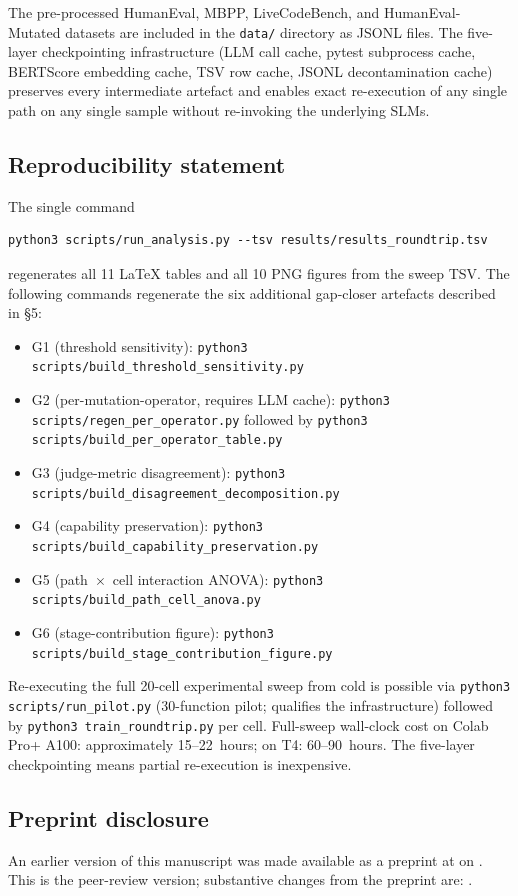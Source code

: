 The pre-processed HumanEval, MBPP, LiveCodeBench, and HumanEval-Mutated datasets are included in the \texttt{data/} directory as JSONL files. The five-layer checkpointing infrastructure (LLM call cache, pytest subprocess cache, BERTScore embedding cache, TSV row cache, JSONL decontamination cache) preserves every intermediate artefact and enables exact re-execution of any single path on any single sample without re-invoking the underlying SLMs.

\subsection{Reproducibility statement}

The single command
\begin{verbatim}
python3 scripts/run_analysis.py --tsv results/results_roundtrip.tsv
\end{verbatim}
regenerates all 11 LaTeX tables and all 10 PNG figures from the sweep TSV. The following commands regenerate the six additional gap-closer artefacts described in \S{}5:
\begin{itemize}
  \item G1 (threshold sensitivity): \texttt{python3 scripts/build\_threshold\_sensitivity.py}
  \item G2 (per-mutation-operator, requires LLM cache): \texttt{python3 scripts/regen\_per\_operator.py} followed by \texttt{python3 scripts/build\_per\_operator\_table.py}
  \item G3 (judge-metric disagreement): \texttt{python3 scripts/build\_disagreement\_decomposition.py}
  \item G4 (capability preservation): \texttt{python3 scripts/build\_capability\_preservation.py}
  \item G5 (path~$\times$~cell interaction ANOVA): \texttt{python3 scripts/build\_path\_cell\_anova.py}
  \item G6 (stage-contribution figure): \texttt{python3 scripts/build\_stage\_contribution\_figure.py}
\end{itemize}

Re-executing the full 20-cell experimental sweep from cold is possible via \texttt{python3 scripts/run\_pilot.py} (30-function pilot; qualifies the infrastructure) followed by \texttt{python3 train\_roundtrip.py} per cell. Full-sweep wall-clock cost on Colab Pro+ A100: approximately 15--22~hours; on T4: 60--90~hours. The five-layer checkpointing means partial re-execution is inexpensive.

\subsection{Preprint disclosure}

An earlier version of this manuscript was made available as a preprint at  on . This is the peer-review version; substantive changes from the preprint are: .
